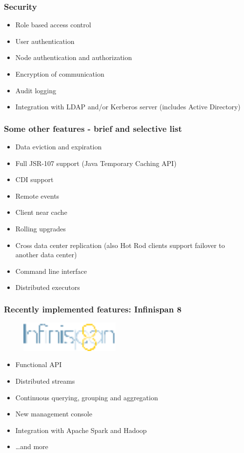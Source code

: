 \documentclass[10pt,utf8]{beamer}
\begin{document}
\begin{frame}
	\frametitle{Security}
	\begin{itemize}
	 \item Role based access control
	 \pause
	 \item User authentication
	 \pause
	 \item Node authentication and authorization
	 \pause
	 \item Encryption of communication
	 \pause
	 \item Audit logging
	 \pause
	 \item Integration with LDAP and/or Kerberos server (includes Active Directory)
	\end{itemize}
\end{frame}


\begin{frame}
  \frametitle{Some other features - brief and selective list}
  \begin{itemize}
		\item Data eviction and expiration
		\pause
		\item Full JSR-107 support (Java Temporary Caching API)
		\pause
		\item CDI support
		\pause
		\item Remote events
		\pause
		\item Client near cache
		\pause
		\item Rolling upgrades
		\pause
		\item Cross data center replication (also Hot Rod clients support failover to another data center)
		\pause
		\item Command line interface
		\pause
		\item Distributed executors
  \end{itemize}
\end{frame}


\begin{frame}
	\frametitle{Recently implemented features: Infinispan 8}
	\begin{figure}
		\centering
		\includegraphics[width=5cm]{./img/infinispan8.eps}
	\end{figure}
  \begin{itemize}
    \item Functional API
		\pause
		\item Distributed streams
		\pause
		\item Continuous querying, grouping and aggregation
		\pause
		\item New management console
		\pause
		\item Integration with Apache Spark and Hadoop
		\item \dots and more
  \end{itemize}
\end{frame}
\end{document}
